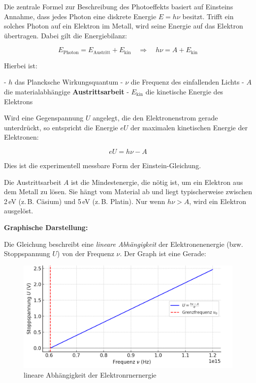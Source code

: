 Die zentrale Formel zur Beschreibung des Photoeffekts basiert auf Einsteins Annahme, dass jedes Photon eine diskrete Energie \( E = h\nu \) besitzt. Trifft ein solches Photon auf ein Elektron im Metall, wird seine Energie auf das Elektron übertragen. Dabei gilt die Energiebilanz:

\[
E_{\text{Photon}} = E_{\text{Austritt}} + E_{\text{kin}}
\quad\Rightarrow\quad h \nu = A + E_{\text{kin}}
\]

Hierbei ist:

- \( h \) das Plancksche Wirkungsquantum  
- \( \nu \) die Frequenz des einfallenden Lichts  
- \( A \) die materialabhängige \textbf{Austrittsarbeit}  
- \( E_{\text{kin}} \) die kinetische Energie des Elektrons

Wird eine Gegenspannung \( U \) angelegt, die den Elektronenstrom gerade unterdrückt, so entspricht die Energie \( e U \) der maximalen kinetischen Energie der Elektronen:

\[
eU = h \nu - A
\]

Dies ist die experimentell messbare Form der Einstein-Gleichung.

\vspace{0.5em}
\begin{tcolorbox}[physikbox, title=Was ist die Austrittsarbeit \( A \)?]
	\label{bos:was ist Austrittsarbeit}
	\small
	Die Austrittsarbeit \( A \) ist die Mindestenergie, die nötig ist, um ein Elektron aus dem Metall zu lösen. Sie hängt vom Material ab und liegt typischerweise zwischen 2\,eV (z.\,B. Cäsium) und 5\,eV (z.\,B. Platin). Nur wenn \( h \nu > A \), wird ein Elektron ausgelöst.
\end{tcolorbox}
\medskip
\textbf{Graphische Darstellung:}

Die Gleichung beschreibt eine \textit{lineare Abhängigkeit} der Elektronenenergie (bzw. Stoppspannung \( U \)) von der Frequenz \( \nu \). Der Graph ist eine Gerade:
\begin{figure}[H]
	\includegraphics[width=0.65\linewidth]{bilder/photoeffekt.png}
	\caption{lineare Abhängigkeit der Elektronrnernergie}
\end{figure}

